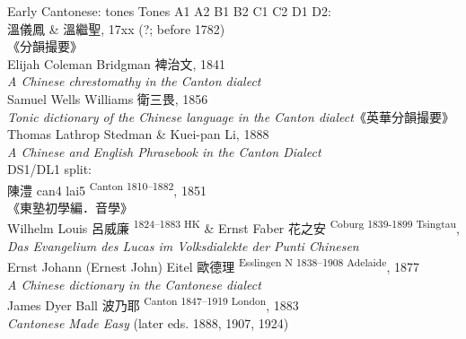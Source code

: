 \documentclass{beamer}
\begin{document}
\begin{frame}[fragile]{Early Cantonese: tones}
Tones A1 A2 B1 B2 C1 C2 D1 D2:\\
\smallskip
{\footnotesize
溫儀鳳 \& 溫繼聖, 17xx (?; before 1782)\\
\quad 《分韻撮要》\\
Elijah Coleman Bridgman 裨治文, 1841\\
\quad \textit{A Chinese chrestomathy in the Canton dialect}\\
Samuel Wells Williams 衛三畏, 1856\\
\quad \textit{Tonic dictionary of the Chinese language in the Canton dialect}{\tiny《英華分韻撮要》}\\
Thomas Lathrop Stedman \& Kuei-pan Li, 1888\\
\quad \textit{A Chinese and English Phrasebook in the Canton Dialect}\\
}
\medskip
DS1/DL1 split:\\
\smallskip
{\footnotesize
陳澧 can4 lai5 \textsuperscript{Canton 1810–1882}, 1851\\
\quad 《東塾初學編．音學》\\
Wilhelm Louis 呂威廉 \textsuperscript{1824–1883 HK} \& Ernst Faber 花之安 \textsuperscript{Coburg 1839-1899 Tsingtau},\\ 
 \textit{Das Evangelium des Lucas im Volksdialekte der Punti Chinesen}\\
Ernst Johann (Ernest John) Eitel 歐德理 \textsuperscript{Esslingen N 1838–1908 Adelaide}, 1877\\
\quad \textit{A Chinese dictionary in the Cantonese dialect}\\
James Dyer Ball 波乃耶 \textsuperscript{Canton 1847–1919 London}, 1883\\
\quad \textit{Cantonese Made Easy} (later eds. 1888, 1907, 1924)\\
}
\end{frame}
\end{document}
